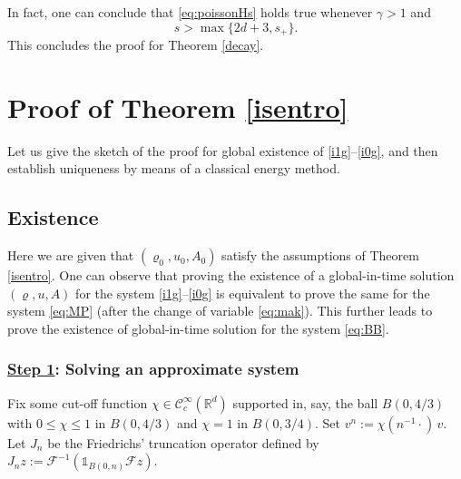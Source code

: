 \documentclass[11pt,twoside]{amsart}
\newcommand\R{\mathbb{R}}
\def\cC{{\mathcal C}}
\def\cF{{\mathcal F}}
\begin{document}
In fact, one can conclude that \eqref{eq:poissonHs} holds true whenever $\gamma>1$ and
\begin{equation}
\label{eq:condP}
s>\max\{2d+3,s_+\}.
\end{equation}
This concludes the proof for Theorem \ref{decay}.  




\section{Proof of  Theorem \ref{isentro}}\label{Proof-main-result}



Let us give the sketch of the proof for global existence
of  \eqref{i1g}--\eqref{i0g}, and 
then establish  uniqueness by means of a classical energy method.

\subsection{Existence} 

Here we are given that $(\varrho_0,u_0,A_0)$ satisfy the assumptions of Theorem \ref{isentro}. 
One can observe that  proving the existence of a global-in-time solution $(\varrho, u, A)$ for the  system  \eqref{i1g}--\eqref{i0g} is equivalent to prove the same for the system \eqref{eq:MP} (after the change of variable \eqref{eq:mak}). This further leads to  prove   the existence of global-in-time solution for  the system \eqref{eq:BB}.   







\subsubsection*{\underline{Step 1}: Solving an approximate system}

Fix some cut-off function $\chi\in \cC^\infty_c(\R^d)$ supported in, say, the ball $B(0,4/3)$ 
with  $0\leq \chi \leq 1$ in $B(0,4/3)$ and  $\chi=1$ in $B(0,3/4).$ 
%
Set $v^n:=\chi(n^{-1}\cdot)\,v.$ 
Let $J_n$ be the Friedrichs' truncation operator 
defined by  $J_n z:=\cF^{-1}(\mathds{1}_{B(0,n)} \cF z).$ 
\end{document}
